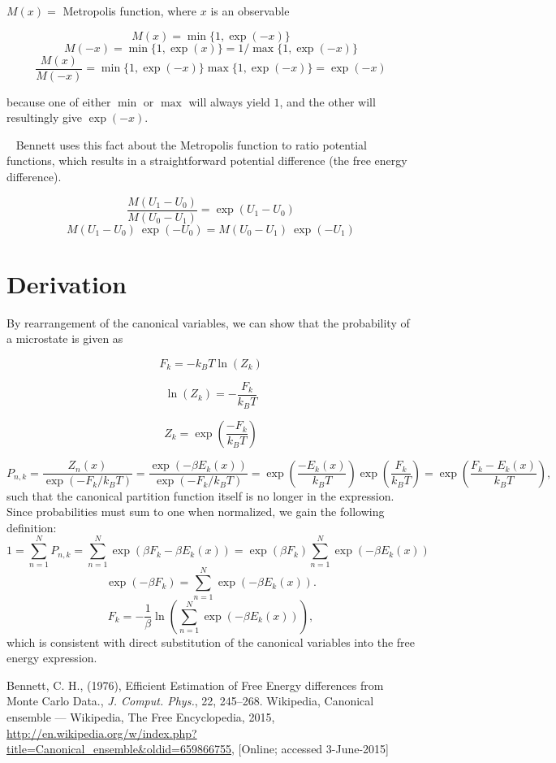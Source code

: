 \documentclass[]{article}
\begin{document}
$M(x) =$ Metropolis function, where $x$ is an observable

\[ M(x) = \min \{ 1, \exp(-x) \} \]
\[ M(-x) = \min \{ 1, \exp(x) \} = 1/ \max \{ 1, \exp(-x) \} \]
\[ \frac{M(x)}{M(-x)} = \min \{ 1, \exp(-x) \} \max \{ 1, \exp(-x) \}  = \exp(-x) \]

because one of either $\min$ or $\max$ will always yield $1$, and the other will resultingly give $\exp(-x)$.

~\linebreak
Bennett uses this fact about the Metropolis function to ratio potential functions, which results in a straightforward potential difference (the free energy difference).

\[ \frac{M(U_1 - U_0)}{M(U_0 - U_1)} = \exp(U_1 - U_0) \]
\[ M(U_1 - U_0)~\exp(-U_0) = M(U_0 - U_1)~\exp(-U_1) \]

\section*{Derivation}

By rearrangement of the canonical variables, we can show that the probability of a microstate\cite{wikiCPF} is given as
\begin{minipage}[b]{0.32\linewidth}
	\[ F_k = -k_B T \ln(Z_k) \]
\end{minipage}
\hfill
\begin{minipage}[b]{0.32\linewidth}
	\[ \ln(Z_k) = -\frac{F_k}{k_B T}  \]
\end{minipage}
\hfill
\begin{minipage}[b]{0.32\linewidth}
	\[ Z_k = \exp \left( \frac{-F_k}{k_B T} \right) \]
\end{minipage}
\[ P_{n,k} = \frac{Z_n(x)}{\exp (-F_k/k_B T)} = \frac{\exp(-\beta E_k(x))}{\exp (-F_k/k_B T)} = \exp\left(\frac{-E_k(x)}{k_B T}\right) \exp \left( \frac{F_k}{k_B T} \right) = \exp\left(\frac{F_k-E_k(x)}{k_B T} \right), \]
such that the canonical partition function itself is no longer in the expression. Since probabilities must sum to one when normalized, we gain the following definition:
\[ 1 = \sum_{n=1}^{N} P_{n,k} = \sum_{n=1}^{N} \exp(\beta F_k - \beta E_k(x)) = \exp(\beta F_k) \sum_{n=1}^{N} \exp(- \beta E_k(x)) \]
\[ \exp(-\beta F_k) = \sum_{n=1}^{N} \exp(- \beta E_k(x)). \]
\[ F_k = -\frac{1}{\beta} \ln \left( \sum_{n=1}^{N} \exp(- \beta E_k(x)) \right), \]
which is consistent with direct substitution of the canonical variables into the free energy expression.

\begin{thebibliography}{9}
		Bennett, C. H.,
		(1976),
		Efficient Estimation of Free Energy differences from Monte Carlo Data.,
		\emph{J. Comput. Phys.},
		22, 
		245–268.
		Wikipedia,
		Canonical ensemble --- Wikipedia{,} The Free Encyclopedia,
		2015,
		\url{http://en.wikipedia.org/w/index.php?title=Canonical_ensemble&oldid=659866755},
		[Online; accessed 3-June-2015]
\end{thebibliography}
\end{document}
